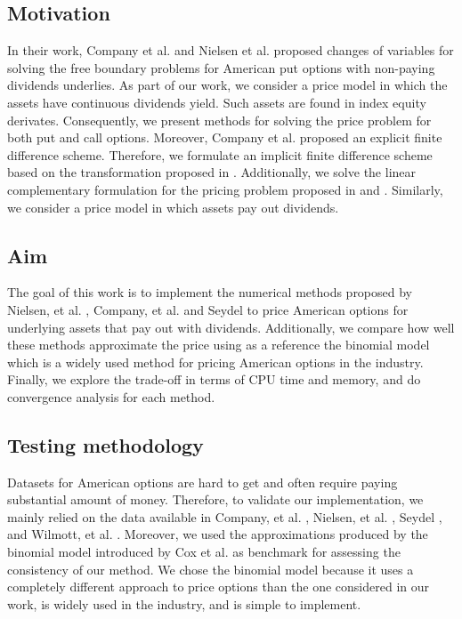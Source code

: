 \subsection{Motivation}

In their work, Company et al. \cite*{company_egorova_jodar_2014} and Nielsen 
et al. \cite*{nielsen_2001} proposed changes of variables for solving the free
boundary problems for American put options with non-paying dividends underlies.
 As part of our work, we consider a price model in which
the assets have continuous dividends yield. Such assets are found in index
equity derivates. Consequently, we present methods for solving the price problem
for both put and call options. Moreover, Company et al. \cite*{company_egorova_jodar_2014} 
proposed an explicit finite difference scheme. Therefore, we formulate an implicit 
finite difference scheme based on the transformation proposed in 
\cite*{company_egorova_jodar_2014}. Additionally, we solve the linear complementary
formulation for the pricing problem proposed in \cite*{seydel_2009} and 
\cite*{wilmott_howison_dewynne_1995}. Similarly, we consider a price model in which
assets pay out dividends.


\subsection{Aim} 

The goal of this work is to implement the numerical methods proposed by 
Nielsen, et al. \cite{nielsen_2001}, Company, et al. \cite{company_egorova_jodar_2014}
and Seydel \cite*{seydel_2009} to price American options for underlying assets 
that pay out with dividends. Additionally, we compare how well these methods approximate 
the price using as a reference the binomial model which is a widely used method 
for pricing American options in the industry. Finally, we explore the 
trade-off in terms of CPU time and memory, and do convergence analysis for each method.


\subsection{Testing methodology}

Datasets for American options are hard to get and often require paying substantial
amount of money. Therefore, to validate our implementation, we mainly relied on the data available in Company, 
et al. \cite*{company_egorova_jodar_2014}, Nielsen, et al. \cite*{nielsen_2001}, 
Seydel \cite*{seydel_2009}, and Wilmott, et al. \cite*{wilmott_howison_dewynne_1995}.
Moreover, we used the approximations produced by the binomial model 
introduced by Cox et al. \cite{cox_1979} as benchmark for assessing the consistency 
of our method. We chose the binomial model because it uses a completely different 
approach to price options than the one considered in our work, is widely used in
the industry, and is simple to implement. 

